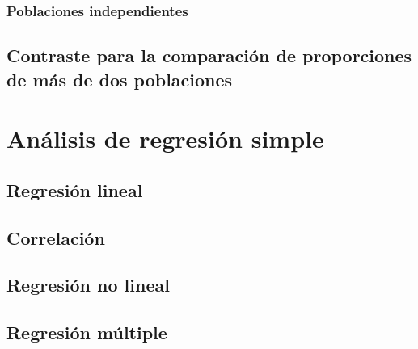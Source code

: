 \documentclass[
]{book}
\theoremstyle{definition}
\theoremstyle{definition}
\theoremstyle{definition}
\theoremstyle{definition}
\theoremstyle{remark}
\begin{document}
\hypertarget{poblaciones-independientes-1}{%
\subsection{Poblaciones independientes}\label{poblaciones-independientes-1}}

\hypertarget{contraste-para-la-comparaciuxf3n-de-proporciones-de-muxe1s-de-dos-poblaciones}{%
\section{Contraste para la comparación de proporciones de más de dos poblaciones}\label{contraste-para-la-comparaciuxf3n-de-proporciones-de-muxe1s-de-dos-poblaciones}}

\hypertarget{anuxe1lisis-de-regresiuxf3n-simple}{%
\chapter{Análisis de regresión simple}\label{anuxe1lisis-de-regresiuxf3n-simple}}

\hypertarget{regresiuxf3n-lineal}{%
\section{Regresión lineal}\label{regresiuxf3n-lineal}}

\hypertarget{correlaciuxf3n}{%
\section{Correlación}\label{correlaciuxf3n}}

\hypertarget{regresiuxf3n-no-lineal}{%
\section{Regresión no lineal}\label{regresiuxf3n-no-lineal}}

\hypertarget{regresiuxf3n-muxfaltiple}{%
\section{Regresión múltiple}\label{regresiuxf3n-muxfaltiple}}

  
\end{document}

